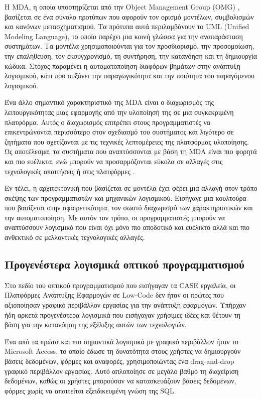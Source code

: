             Η MDA, η οποία υποστηρίζεται από την Object Management Group (OMG) \cite{OMG_MDA}, βασίζεται σε ένα σύνολο προτύπων που αφορούν τον ορισμό μοντέλων, συμβολισμών και κανόνων μετασχηματισμού. Τα πρότυπα αυτά περιλαμβάνουν το UML (Unified Modeling Language), το οποίο παρέχει μια κοινή γλώσσα για την αναπαράσταση συστημάτων. Τα μοντέλα χρησιμοποιούνται για τον προσδιορισμό, την προσομοίωση, την επαλήθευση, τον εκσυγχρονισμό, τη συντήρηση, την κατανόηση και τη δημιουργία κώδικα. Στόχος παραμένει η αυτοματοποίηση διαφόρων βημάτων στην ανάπτυξη λογισμικού, κάτι που αυξάνει την παραγωγικότητα και την ποιότητα του παραγόμενου λογισμικού.

            Ένα άλλο σημαντικό χαρακτηριστικό της MDA είναι ο διαχωρισμός της λειτουργικότητας μιας εφαρμογής από την υλοποίησή της σε μια συγκεκριμένη πλατφόρμα. Αυτός ο διαχωρισμός επιτρέπει στους προγραμματιστές να επικεντρώνονται περισσότερο στον σχεδιασμό του συστήματος και λιγότερο σε ζητήματα που σχετίζονται με τις τεχνικές λεπτομέρειες της πλατφόρμας υλοποίησης. Ως αποτέλεσμα, τα συστήματα που αναπτύσσονται με βάση τη MDA είναι πιο φορητά και πιο ευέλικτα, ενώ μπορούν να προσαρμόζονται εύκολα σε αλλαγές στις τεχνολογικές απαιτήσεις ή στις πλατφόρμες \cite{Bucaioni2022, MDELow, MDSDSpringer}.

            Εν τέλει, η αρχιτεκτονική που βασίζεται σε μοντέλα έχει φέρει μια αλλαγή στον τρόπο σκέψης των προγραμματιστών και μηχανικών λογισμικού. Εισήγαγε μια κουλτούρα που βασίζεται στην αφαιρετικότητα, τον σωστό διαχωρισμό των χαρακτηριστικών και την αυτοματοποίηση. Με αυτόν τον τρόπο, οι προγραμματιστές μπορούν να αναπτύσσουν λογισμικό που είναι όχι μόνο πιο αποδοτικό και ευέλικτο αλλά και πιο ανθεκτικό σε μελλοντικές τεχνολογικές αλλαγές.

        \subsection{Προγενέστερα λογισμικά οπτικού προγραμματισμού}
            Στο πεδίο του οπτικού προγραμματισμού που εισήγαγαν τα CASE εργαλεία, οι Πλατφόρμες Ανάπτυξης Εφαρμογών σε Low-Code δεν ήταν οι πρώτες που αξιοποίησαν γραφικό περιβάλλον εργασίας για την ανάπτυξη εφαρμογών. Υπήρχαν ήδη αρκετά προγενέστερα λογισμικά που εισήγαγαν χρήσιμες ιδέες και θέτουν τη βάση για την κατανόηση της εξέλιξης αυτών των τεχνολογιών.

            Ένα από τα πρώτα και πιο σημαντικά λογισμικά με γραφικό περιβάλλον ήταν το Microsoft Access, το οποίο έδωσε τη δυνατότητα στους χρήστες να δημιουργούν βάσεις δεδομένων, φόρμες και αναφορές, χρησιμοποιώντας ένα drag-and-drop γραφικό περιβάλλον εργασίας. Αυτό απλοποίησε σε μεγάλο βαθμό τη διαχείριση δεδομένων, καθώς οι χρήστες μπορούσαν να κατασκευάζουν βάσεις δεδομένων, φόρμες χωρίς να απαιτείται εξειδικευμένη γνώση της SQL.

